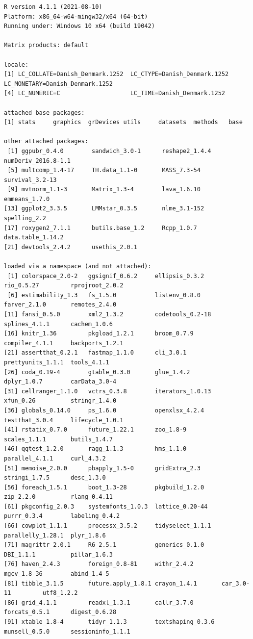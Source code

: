 \documentclass[12pt]{article}
\begin{document}
\begin{verbatim}
R version 4.1.1 (2021-08-10)
Platform: x86_64-w64-mingw32/x64 (64-bit)
Running under: Windows 10 x64 (build 19042)

Matrix products: default

locale:
[1] LC_COLLATE=Danish_Denmark.1252  LC_CTYPE=Danish_Denmark.1252    LC_MONETARY=Danish_Denmark.1252
[4] LC_NUMERIC=C                    LC_TIME=Danish_Denmark.1252    

attached base packages:
[1] stats     graphics  grDevices utils     datasets  methods   base     

other attached packages:
 [1] ggpubr_0.4.0        sandwich_3.0-1      reshape2_1.4.4      numDeriv_2016.8-1.1
 [5] multcomp_1.4-17     TH.data_1.1-0       MASS_7.3-54         survival_3.2-13    
 [9] mvtnorm_1.1-3       Matrix_1.3-4        lava_1.6.10         emmeans_1.7.0      
[13] ggplot2_3.3.5       LMMstar_0.3.5       nlme_3.1-152        spelling_2.2       
[17] roxygen2_7.1.1      butils.base_1.2     Rcpp_1.0.7          data.table_1.14.2  
[21] devtools_2.4.2      usethis_2.0.1      

loaded via a namespace (and not attached):
 [1] colorspace_2.0-2   ggsignif_0.6.2     ellipsis_0.3.2     rio_0.5.27         rprojroot_2.0.2   
 [6] estimability_1.3   fs_1.5.0           listenv_0.8.0      farver_2.1.0       remotes_2.4.0     
[11] fansi_0.5.0        xml2_1.3.2         codetools_0.2-18   splines_4.1.1      cachem_1.0.6      
[16] knitr_1.36         pkgload_1.2.1      broom_0.7.9        compiler_4.1.1     backports_1.2.1   
[21] assertthat_0.2.1   fastmap_1.1.0      cli_3.0.1          prettyunits_1.1.1  tools_4.1.1       
[26] coda_0.19-4        gtable_0.3.0       glue_1.4.2         dplyr_1.0.7        carData_3.0-4     
[31] cellranger_1.1.0   vctrs_0.3.8        iterators_1.0.13   xfun_0.26          stringr_1.4.0     
[36] globals_0.14.0     ps_1.6.0           openxlsx_4.2.4     testthat_3.0.4     lifecycle_1.0.1   
[41] rstatix_0.7.0      future_1.22.1      zoo_1.8-9          scales_1.1.1       butils_1.4.7      
[46] qqtest_1.2.0       ragg_1.1.3         hms_1.1.0          parallel_4.1.1     curl_4.3.2        
[51] memoise_2.0.0      pbapply_1.5-0      gridExtra_2.3      stringi_1.7.5      desc_1.3.0        
[56] foreach_1.5.1      boot_1.3-28        pkgbuild_1.2.0     zip_2.2.0          rlang_0.4.11      
[61] pkgconfig_2.0.3    systemfonts_1.0.3  lattice_0.20-44    purrr_0.3.4        labeling_0.4.2    
[66] cowplot_1.1.1      processx_3.5.2     tidyselect_1.1.1   parallelly_1.28.1  plyr_1.8.6        
[71] magrittr_2.0.1     R6_2.5.1           generics_0.1.0     DBI_1.1.1          pillar_1.6.3      
[76] haven_2.4.3        foreign_0.8-81     withr_2.4.2        mgcv_1.8-36        abind_1.4-5       
[81] tibble_3.1.5       future.apply_1.8.1 crayon_1.4.1       car_3.0-11         utf8_1.2.2        
[86] grid_4.1.1         readxl_1.3.1       callr_3.7.0        forcats_0.5.1      digest_0.6.28     
[91] xtable_1.8-4       tidyr_1.1.3        textshaping_0.3.6  munsell_0.5.0      sessioninfo_1.1.1
\end{verbatim}
\end{document}
